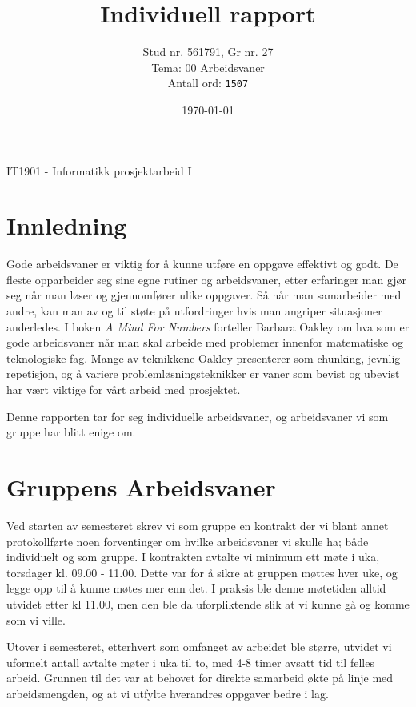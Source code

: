 \documentclass[a4paper, 12pt]{article}  %
\title{Individuell rapport}             %
\author{Stud nr. 561791, Gr nr. 27       %
\\Tema: 00 Arbeidsvaner
\\Antall ord: \texttt{1507}}
\date{\today}                           %
\begin{document}
\maketitle
\vfill
\begin{center}
    IT1901 - Informatikk prosjektarbeid I 
\end{center}
\thispagestyle{empty}
\addtocounter{page}{-1}
\newpage
\tableofcontents %
\thispagestyle{empty}
\addtocounter{page}{-1}
\newpage

\section{Innledning}

Gode arbeidsvaner er viktig for å kunne utføre en oppgave effektivt og godt.
De fleste opparbeider seg sine egne rutiner og arbeidsvaner, etter erfaringer man gjør seg når man løser og gjennomfører ulike oppgaver.
Så når man samarbeider med andre, kan man av og til støte på utfordringer hvis man angriper situasjoner anderledes.
I boken \emph{A Mind For Numbers} \cite{oakley} forteller Barbara Oakley om hva som er gode arbeidsvaner når man skal arbeide med problemer innenfor matematiske og teknologiske fag. Mange av teknikkene Oakley presenterer som chunking, jevnlig repetisjon, og å variere problemløsningsteknikker er vaner som bevist og ubevist har vært viktige for vårt arbeid med prosjektet.

Denne rapporten tar for seg individuelle arbeidsvaner, og arbeidsvaner vi som gruppe har blitt enige om.

\section{Gruppens Arbeidsvaner}

Ved starten av semesteret skrev vi som gruppe en kontrakt der vi blant annet protokollførte noen forventinger om hvilke arbeidsvaner vi skulle ha; både individuelt og som gruppe.
I kontrakten avtalte vi minimum ett møte i uka, torsdager kl. 09.00 - 11.00. Dette var for å sikre at gruppen møttes hver uke, og legge opp til å kunne møtes mer enn det. 
I praksis ble denne møtetiden alltid utvidet etter kl 11.00, men den ble da uforpliktende slik at vi kunne gå og komme som vi ville.

Utover i semesteret, etterhvert som omfanget av arbeidet ble større, utvidet vi uformelt antall avtalte møter i uka til to, med 4-8 timer avsatt tid til felles arbeid. 
Grunnen til det var at behovet for direkte samarbeid økte på linje med arbeidsmengden, og at vi utfylte hverandres oppgaver bedre i lag.
\end{document}
